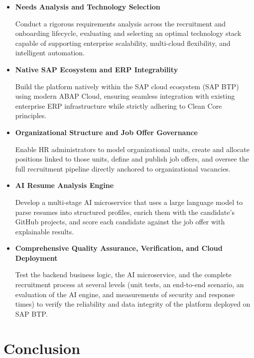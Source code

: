 \begin{itemize}
    \item \textbf{Needs Analysis and Technology Selection}
    
    Conduct a rigorous requirements analysis across the recruitment and onboarding lifecycle, evaluating and selecting an optimal technology stack capable of supporting enterprise scalability, multi-cloud flexibility, and intelligent automation.

    \item \textbf{Native SAP Ecosystem and ERP Integrability}
    
    Build the platform natively within the SAP cloud ecosystem (SAP BTP) using modern ABAP Cloud, ensuring seamless integration with existing enterprise ERP infrastructure while strictly adhering to Clean Core principles.

    \item \textbf{Organizational Structure and Job Offer Governance}
    
    Enable HR administrators to model organizational units, create and allocate positions linked to those units, define and publish job offers, and oversee the full recruitment pipeline directly anchored to organizational vacancies.

    \item \textbf{AI Resume Analysis Engine}

    Develop a multi-stage AI microservice that uses a large language model to parse resumes into structured profiles, enrich them with the candidate's GitHub projects, and score each candidate against the job offer with explainable results.

    \item \textbf{Comprehensive Quality Assurance, Verification, and Cloud Deployment}

    Test the backend business logic, the AI microservice, and the complete recruitment process at several levels (unit tests, an end-to-end scenario, an evaluation of the AI engine, and measurements of security and response times) to verify the reliability and data integrity of the platform deployed on SAP BTP.
\end{itemize}
\newpage
\section*{Conclusion}

